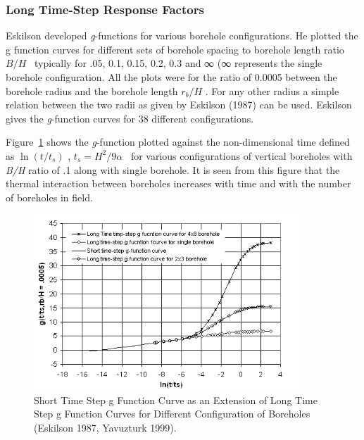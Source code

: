 \subsubsection{Long Time-Step Response Factors}\label{long-time-step-response-factors}

Eskilson developed \emph{g}-functions for various borehole configurations. He plotted the g function curves for different sets of borehole spacing to borehole length ratio \(B/H\) ~typically for .05, 0.1, 0.15, 0.2, 0.3 and ∞ (∞ represents the single borehole configuration. All the plots were for the ratio of 0.0005 between the borehole radius and the borehole length \({r_b}/H\) . For any other radius a simple relation between the two radii as given by Eskilson (1987) can be used. Eskilson gives the \emph{g}-function curves for 38 different configurations.

Figure~\ref{fig:short-time-step-g-function-curve-as-an} shows the \emph{g}-function plotted against the non-dimensional time defined as \(\ln (t/{t_s})\) , \({t_s} = {H^2}/9\alpha\) ~for various configurations of vertical boreholes with \emph{B/H} ratio of .1 along with single borehole. It is seen from this figure that the thermal interaction between boreholes increases with time and with the number of boreholes in field.

\begin{figure}[hbtp] %
\centering
\includegraphics[width=0.9\textwidth, height=0.9\textheight, keepaspectratio=true]{media/image5651.png}
\caption{  Short Time Step g Function Curve as an Extension of Long Time Step g Function Curves for Different Configuration of Boreholes (Eskilson 1987, Yavuzturk 1999). \protect \label{fig:short-time-step-g-function-curve-as-an}}
\end{figure}

